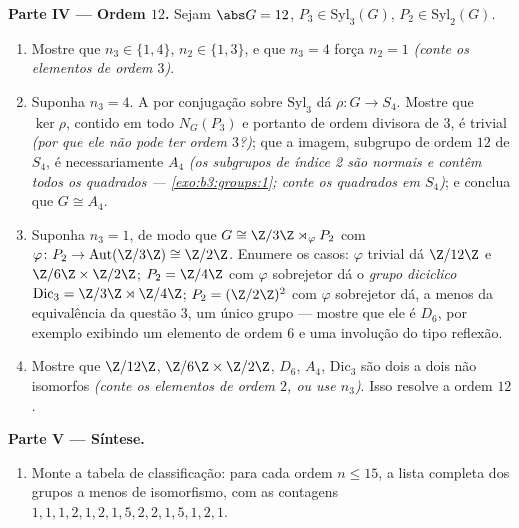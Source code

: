 \begin{problem}
\medskip
\noindent\textbf{Parte IV --- Ordem $12$.} Sejam $\abs G = 12$, $P_3
\in \mathrm{Syl}_3(G)$,
$P_2 \in \mathrm{Syl}_2(G)$.
\begin{enumerate}[resume]
  \item Mostre que $n_3 \in \{1, 4\}$, $n_2 \in \{1, 3\}$, e que $n_3
        = 4$ força $n_2 = 1$
        \emph{(conte os elementos de ordem $3$)}.
  \item Suponha $n_3 = 4$. A  por conjugação sobre $\mathrm{Syl}_3$ dá $\rho \colon G \to S_4$.
        Mostre que $\ker \rho$, contido em todo $N_G(P_3)$ e portanto de ordem
        divisora de $3$, é trivial \emph{(por que ele não pode ter
        ordem $3$?)}; que a imagem, subgrupo de ordem $12$ de
        $S_4$, é necessariamente $A_4$ \emph{(os subgrupos de
        índice 2 são normais e contêm todos os quadrados ---
        \cref{exo:b3:groups:1}; conte os quadrados em $S_4$)}; e conclua
        que $G \cong A_4$.
  \item Suponha $n_3 = 1$, de modo que $G \cong \Z/3\Z \rtimes_\varphi P_2$ com $\varphi \colon P_2 \to \operatorname{Aut}(\Z/3\Z)
        \cong \Z/2\Z$. Enumere os
        casos: $\varphi$ trivial dá $\Z/12\Z$ e $\Z/6\Z \times \Z/2\Z$; $P_2 =
        \Z/4\Z$ com $\varphi$
        sobrejetor dá o \emph{grupo diciclico} $\mathrm{Dic}_3 = \Z/3\Z \rtimes
        \Z/4\Z$; $P_2 = (\Z/2\Z)^2$ com
        $\varphi$ sobrejetor dá, a menos da equivalência da questão 3, um
        único grupo --- mostre que ele é $D_6$, por exemplo
        exibindo um elemento de ordem $6$ e uma involução do tipo
        reflexão.
  \item Mostre que $\Z/12\Z$, $\Z/6\Z \times \Z/2\Z$, $D_6$, $A_4$, $\mathrm{Dic}_3$ são
        dois a dois não isomorfos \emph{(conte os elementos de ordem
        $2$, ou use $n_3$)}. Isso resolve a ordem $12$.
\end{enumerate}

\medskip
\noindent\textbf{Parte V --- Síntese.}
\begin{enumerate}[resume]
  \item Monte a tabela de classificação: para cada ordem $n \leq
        15$, a
        lista completa dos grupos a menos de isomorfismo, com as
        contagens $1, 1, 1, 2, 1, 2, 1, 5, 2, 2, 1, 5, 1, 2, 1$.
\end{enumerate}


\end{problem}
